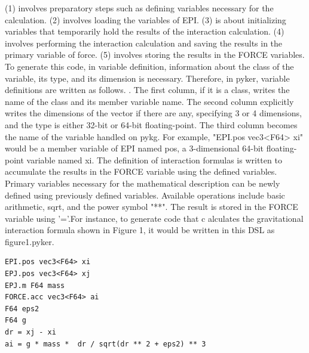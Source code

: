 \documentclass[ams, a4j]{U-AizuGT}
\begin{document}
(1) involves preparatory steps such as defining variables necessary for the calculation. (2) 
involves loading the variables of EPI. (3) is about initializing variables that temporarily
 hold the results of the interaction calculation. (4) involves performing the interaction 
 calculation and saving the results in the primary variable of force. (5) involves storing the results in the FORCE variables.
To generate this code, in variable definition, information about the class of the variable,
 its type, and its dimension is necessary. Therefore, in pyker, variable definitions are written as follows. .
The first column, if it is a class, writes the name of the class and its member variable
 name. The second column explicitly writes the dimensions of the vector if there are any, 
 specifying 3 or 4 dimensions, and the type is either 32-bit or 64-bit floating-point. The 
 third column becomes the name of the variable handled on pykg. For example, "EPI.pos vec3<F64> xi" 
 would be a member variable of EPI named pos, a 3-dimensional 64-bit floating-point variable named xi.
The definition of interaction formulas is written to accumulate the results in the FORCE variable using
 the defined variables. Primary variables necessary for the mathematical description can be newly defined 
 using previously defined variables. Available operations include basic arithmetic, sqrt, and the power 
 symbol "**". The result is stored in the FORCE variable using '='.For instance, to generate code that c
 alculates the gravitational interaction formula shown in Figure 1, it would be written in this DSL as figure1.pyker.


\begin{lstlisting}[frame=single, caption=hoge, label=fuga]
EPI.pos vec3<F64> xi
EPJ.pos vec3<F64> xj
EPJ.m F64 mass
FORCE.acc vec3<F64> ai
F64 eps2
F64 g
dr = xj - xi
ai = g * mass *  dr / sqrt(dr ** 2 + eps2) ** 3
\end{lstlisting}
\end{document}
